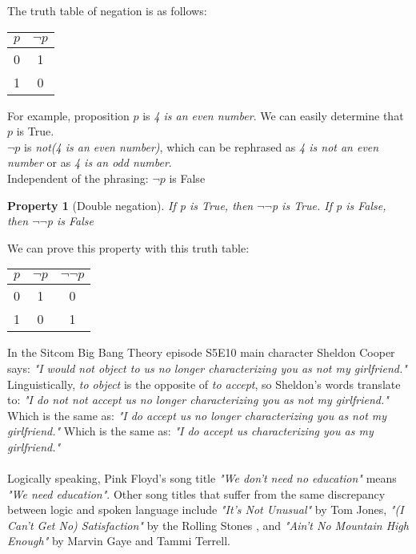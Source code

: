 \documentclass[10pt,a4paper,draft,titlepage,onecolumn]{book}
\newtheorem{property}{Property}[section]
\begin{document}
The truth table of negation is as follows:
\begin{center}
\begin{tabular}{ |c| c| }
 \hline
 $p$ & {$\neg$}$p$ \\
 \hline
 0 & 1 \\ 
 1 & 0 \\
 \hline
\end{tabular}
\end{center}
For example, proposition $p$ is \textit{4 is an even number}. We can easily determine that $p$ is True.\\
$\neg${$p$} is  \textit{not(4 is an even number)}, which can be rephrased as \textit{4 is not an even number} or as \textit{4 is an odd number}.\\
Independent of the phrasing: $\neg${$p$} is False 

\begin{property}[Double negation] If p is True, then {$\neg$}{$\neg$}p is True. If p is False, then {$\neg$}$\neg$p is False
\end{property}
We can prove this property with this truth table:
\begin{center}
\begin{tabular}{ |c| c|c| }
 \hline
 $p$ & {$\neg$}$p$ & {$\neg$}{$\neg$}$p$  \\
 \hline
 0 & 1 & 0 \\ 
 1 & 0 & 1\\
 \hline
\end{tabular}
\end{center}
In the Sitcom Big Bang Theory episode S5E10 main character Sheldon Cooper says: \textit{"I would not object to us no longer characterizing you as not my girlfriend."} Linguistically, \textit{to object }is the opposite of \textit{to accept}, so Sheldon's words translate to: \textit{"I do not not accept us no longer characterizing you as not my girlfriend."} 
Which is the same as: \textit{"I do accept us no longer characterizing you as not my girlfriend."} 
Which is the same as: \textit{"I do accept us characterizing you as my girlfriend."}\\\\
Logically speaking, Pink Floyd's song title \textit{"We don't need no education"} means \textit{"We need education"}. Other song titles that suffer from the same discrepancy between logic and spoken language include \textit{"It’s Not Unusual" }by Tom Jones, \textit{"(I Can’t Get No) Satisfaction" }by the Rolling Stones
, and \textit{"Ain’t No Mountain High Enough" }by Marvin Gaye and Tammi Terrell.
\end{document}
